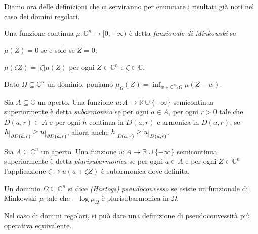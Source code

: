 Diamo ora delle definizioni che ci serviranno per enunciare i risultati già noti nel caso dei domini regolari.

\begin{defn}
    Una funzione continua $\mu:\mathbb{C}^n \longrightarrow [0,+\infty)$ è detta \textit{funzionale di Minkowski} se
    \begin{nlist}
        \item $\mu(Z)=0$ se e solo se $Z=0$;
        \item $\mu(\zeta Z)=|\zeta|\mu(Z)$ per ogni $Z \in \mathbb{C}^n$ e $\zeta\in\mathbb{C}$.
    \end{nlist}
    Dato $\Omega\subseteq\mathbb{C}^n$ un dominio, poniamo $\mu_{\Omega}(Z)=\inf_{w\in\mathbb{C}^n\setminus\Omega}\mu(Z-w)$.
\end{defn}

\begin{defn}
    Sia $A\subseteq\mathbb{C}$ un aperto. Una funzione $u:A \longrightarrow \mathbb{R}\cup\{-\infty\}$ semicontinua superiormente è detta \textit{subarmonica} se per ogni $a \in A$, per ogni $r>0$ tale che $\overline{D(a,r)} \subset A$ e per ogni $h$ continua in $\overline{D(a,r)}$ e armonica in $D(a,r)$, se $h\restrict{\partial D(a,r)} \ge u\restrict{\partial D(a,r)}$, allora anche $h\restrict{D(a,r)} \ge u \restrict{D(a,r)}$.

    Sia $A\subseteq\mathbb{C}^n$ un aperto. Una funzione $u:A \longrightarrow \mathbb{R}\cup\{-\infty\}$ semicontinua superiormente è detta \textit{plurisubarmonica} se per ogni $a \in A$ e per ogni $Z \in \mathbb{C}^n$ l'applicazione $\zeta \longmapsto u(a+\zeta Z)$ è subarmonica dove definita.
\end{defn}

\begin{defn}
    Un dominio $\Omega \subseteq \mathbb{C}^n$ si dice \textit{(Hartogs) pseudoconvesso} se esiste un funzionale di Minkowski $\mu$ tale che $-\log\mu_{\Omega}$ è plurisubarmonica in $\Omega$.
\end{defn}

Nel caso di domini regolari, si può dare una definizione di pseudoconvessità più operativa equivalente.

